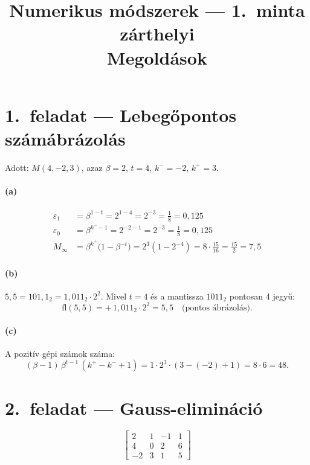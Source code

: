 \documentclass[a4paper,12pt]{article}
\title{Numerikus módszerek --- 1.\ minta zárthelyi\\[6pt]\large Megoldások}
\author{}
\date{}
\begin{document}
\maketitle

\section*{1.\ feladat --- Lebegőpontos számábrázolás}

Adott: $M(4,-2,3)$, azaz $\beta=2$, $t=4$, $k^-= -2$, $k^+=3$.

\paragraph{(a)}
\begin{align}
\varepsilon_1 &= \beta^{1-t} = 2^{1-4} = 2^{-3} = \frac{1}{8} = 0{,}125 \\[4pt]
\varepsilon_0 &= \beta^{k^- - 1} = 2^{-2-1} = 2^{-3} = \frac{1}{8} = 0{,}125 \\[4pt]
M_\infty &= \beta^{k^+}\bigl(1 - \beta^{-t}\bigr) = 2^3\!\left(1 - 2^{-4}\right) = 8 \cdot \frac{15}{16} = \frac{15}{2} = 7{,}5
\end{align}

\paragraph{(b)}
$5{,}5 = 101{,}1_2 = 1{,}011_2 \cdot 2^2$. Mivel $t=4$ és a mantissza $1011_2$ pontosan 4 jegyű:
\[
  \mathrm{fl}(5{,}5) = +\,1{,}011_2 \cdot 2^2 = 5{,}5 \quad\text{(pontos ábrázolás)}.
\]

\paragraph{(c)}
A pozitív gépi számok száma:
\[
  (\beta - 1)\,\beta^{t-1}\,(k^+ - k^- + 1) = 1 \cdot 2^3 \cdot (3-(-2)+1) = 8 \cdot 6 = 48.
\]

\section*{2.\ feladat --- Gauss-elimináció}

\[
\left[\begin{array}{ccc|c}
2 & 1 & -1 & 1 \\
4 & 0 & 2 & 6 \\
-2 & 3 & 1 & 5
\end{array}\right]
\]
\end{document}
